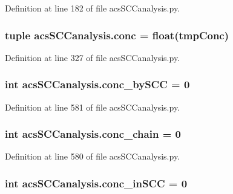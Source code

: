 Definition at line 182 of file acs\-S\-C\-Canalysis.\-py.

\hypertarget{a00096_a6ec435b19c74f79f32a0eae7bb2bd1c8}{
\subsubsection[{conc}]{\setlength{\rightskip}{0pt plus 5cm}tuple acs\-S\-C\-Canalysis.\-conc = float(tmp\-Conc)}}\label{a00096_a6ec435b19c74f79f32a0eae7bb2bd1c8}


Definition at line 327 of file acs\-S\-C\-Canalysis.\-py.

\hypertarget{a00096_aac2f508d526d62bd7f9d4f5a5f8b1821}{
\subsubsection[{conc\-\_\-by\-S\-C\-C}]{\setlength{\rightskip}{0pt plus 5cm}int acs\-S\-C\-Canalysis.\-conc\-\_\-by\-S\-C\-C = 0}}\label{a00096_aac2f508d526d62bd7f9d4f5a5f8b1821}


Definition at line 581 of file acs\-S\-C\-Canalysis.\-py.

\hypertarget{a00096_a3188cc39362e42ecb36d23a98f2b5a78}{
\subsubsection[{conc\-\_\-chain}]{\setlength{\rightskip}{0pt plus 5cm}int acs\-S\-C\-Canalysis.\-conc\-\_\-chain = 0}}\label{a00096_a3188cc39362e42ecb36d23a98f2b5a78}


Definition at line 580 of file acs\-S\-C\-Canalysis.\-py.

\hypertarget{a00096_a3fcb8f9c7e88b5c53f1201a383b38666}{
\subsubsection[{conc\-\_\-in\-S\-C\-C}]{\setlength{\rightskip}{0pt plus 5cm}int acs\-S\-C\-Canalysis.\-conc\-\_\-in\-S\-C\-C = 0}}\label{a00096_a3fcb8f9c7e88b5c53f1201a383b38666}


